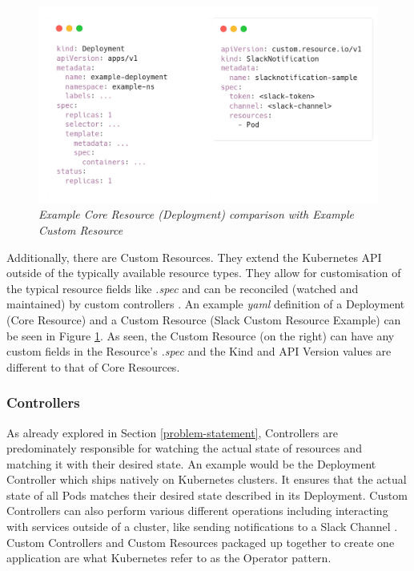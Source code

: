\documentclass{article}
\begin{document}
\begin{figure}[H]
    \centering
    \includegraphics[width=125mm]{tech/core-cr.png}
    \caption{\emph{Example Core Resource (Deployment) comparison with Example Custom Resource}}
    \label{core-cr}
\end{figure}

Additionally, there are Custom Resources. They extend the Kubernetes API outside of the typically available resource types. They allow for customisation of the typical resource fields like \emph{.spec} and can be reconciled (watched and maintained) by custom controllers \cite{cust-res}. An example \emph{yaml} definition of a Deployment (Core Resource) and a Custom Resource (Slack Custom Resource Example) can be seen in Figure \ref{core-cr}. As seen, the Custom Resource (on the right) can have any custom fields in the Resource's \emph{.spec} and the Kind and API Version values are different to that of Core Resources.



\subsubsection{Controllers} \label{controllers}

As already explored in Section \ref{problem-statement}, Controllers are predominately responsible for watching the actual state of resources and matching it with their desired state. An example would be the Deployment Controller which ships natively on Kubernetes clusters. It ensures that the actual state of all Pods matches their desired state described in its Deployment. Custom Controllers can also perform various different operations including interacting with services outside of a cluster, like sending notifications to a Slack Channel \cite{ctrlrs-ref}. Custom Controllers and Custom Resources packaged up together to create one application are what Kubernetes refer to as the Operator pattern.
\end{document}
